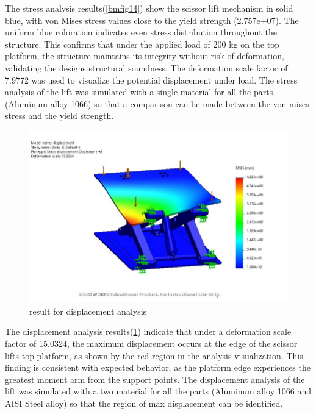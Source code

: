 \documentclass[../../main]{subfiles}
\begin{document}
The stress analysis results(\cref{bmfig14}) show the scissor lift mechanism in solid
blue, with von Mises stress values close to the yield strength
(2.757e+07). The uniform blue coloration indicates even stress
distribution throughout the structure. This confirms that under the
applied load of 200 kg on the top platform, the structure maintains its
integrity without risk of deformation, validating the
design\textquotesingle s structural soundness. The deformation scale
factor of 7.9772 was used to visualize the potential displacement under
load. The stress analysis of the lift was simulated with a single
material for all the parts (Aluminum alloy 1066) so that a comparison
can be made between the von mises stress and the yield strength.

\begin{figure}[h!]
  \centering
  \includegraphics[width=\textwidth]{img/image105.jpg}
  \caption{result for displacement analysis}
  \label{biomaFig15}
  \end{figure}
  

The displacement analysis results(\cref{biomaFig15}) indicate that under a deformation
scale factor of 15.0324, the maximum displacement occurs at the edge of
the scissor lift\textquotesingle s top platform, as shown by the red
region in the analysis visualization. This finding is consistent with
expected behavior, as the platform edge experiences the greatest moment
arm from the support points. The displacement analysis of the lift was
simulated with a two material for all the parts (Aluminum alloy 1066 and
AISI Steel alloy) so that the region of max displacement can be
identified.
\end{document}
